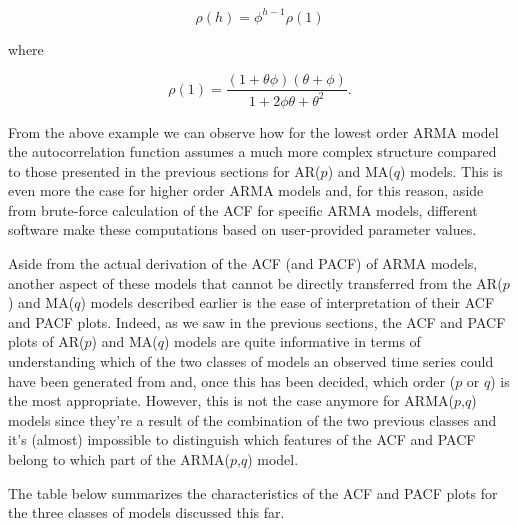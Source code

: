 \documentclass[]{book}
\theoremstyle{definition}
\theoremstyle{definition}
\theoremstyle{definition}
\theoremstyle{remark}
\begin{document}
\[\rho(h) = \phi^{h-1} \rho(1)\]

where

\begin{equation*}
                \rho(1) = \frac{\left(1+\theta \phi \right)\left(\theta + \phi\right)}{1+2\phi\theta+\theta^2}.
\end{equation*}

From the above example we can observe how for the lowest order ARMA
model the autocorrelation function assumes a much more complex structure
compared to those presented in the previous sections for AR(\(p\)) and
MA(\(q\)) models. This is even more the case for higher order ARMA
models and, for this reason, aside from brute-force calculation of the
ACF for specific ARMA models, different software make these computations
based on user-provided parameter values.

Aside from the actual derivation of the ACF (and PACF) of ARMA models,
another aspect of these models that cannot be directly transferred from
the AR(\(p\)) and MA(\(q\)) models described earlier is the ease of
interpretation of their ACF and PACF plots. Indeed, as we saw in the
previous sections, the ACF and PACF plots of AR(\(p\)) and MA(\(q\))
models are quite informative in terms of understanding which of the two
classes of models an observed time series could have been generated from
and, once this has been decided, which order (\(p\) or \(q\)) is the
most appropriate. However, this is not the case anymore for
ARMA(\(p\),\(q\)) models since they're a result of the combination of
the two previous classes and it's (almost) impossible to distinguish
which features of the ACF and PACF belong to which part of the
ARMA(\(p\),\(q\)) model.

The table below summarizes the characteristics of the ACF and PACF plots
for the three classes of models discussed this far.
\end{document}
